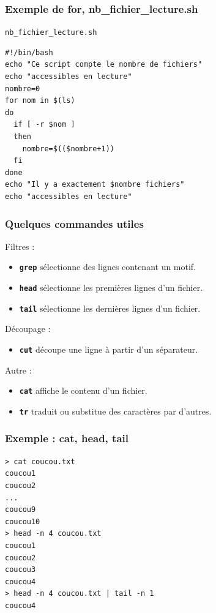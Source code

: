 \documentclass{beamer}
\newenvironment{terminal}{\color{white}\begin{snugshade*}}
{\end{snugshade*}\color{black}}
\begin{document}
\begin{frame}[fragile]
  \frametitle{Exemple de for, nb\_fichier\_lecture.sh}
  \begin{block}{\texttt{nb\_fichier\_lecture.sh}}
\begin{verbatim}
#!/bin/bash
echo "Ce script compte le nombre de fichiers"
echo "accessibles en lecture"
nombre=0
for nom in $(ls)
do
  if [ -r $nom ]
  then
    nombre=$(($nombre+1))
  fi
done
echo "Il y a exactement $nombre fichiers"
echo "accessibles en lecture"
\end{verbatim}
\end{block}
\end{frame}




\begin{frame}[fragile]
\frametitle{Quelques commandes utiles}
Filtres :
\begin{itemize}
\item  \texttt{\bf grep} sélectionne des lignes contenant un motif.
\item \texttt{\bf head} sélectionne les premières lignes d'un fichier.
\item \texttt{\bf tail} sélectionne les dernières lignes d'un fichier.
\end{itemize}

Découpage :
\begin{itemize}
\item \texttt{\bf cut} découpe une ligne à partir d'un séparateur.
\end{itemize}

Autre :
\begin{itemize}
\item \texttt{\bf cat} affiche le contenu d'un fichier.
\item \texttt{\bf tr} traduit ou substitue des caractères par d'autres.
\end{itemize}

\end{frame}


\begin{frame}[fragile]
  \frametitle{Exemple : cat, head, tail}
  \begin{terminal}
\begin{verbatim}
> cat coucou.txt
coucou1
coucou2
...
coucou9
coucou10
> head -n 4 coucou.txt
coucou1
coucou2
coucou3
coucou4
> head -n 4 coucou.txt | tail -n 1
coucou4
\end{verbatim}
\end{terminal}
\end{frame}
\end{document}
